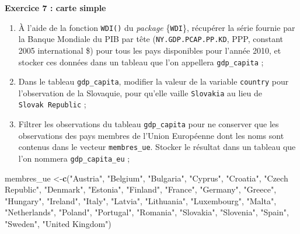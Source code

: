 \documentclass[
  11pt,
]{book}
\makeatletter
\newenvironment{Shaded}{\begin{snugshade}}{\end{snugshade}}
\newcommand{\KeywordTok}[1]{\textcolor[rgb]{0.13,0.29,0.53}{\textbf{#1}}}
\newcommand{\NormalTok}[1]{#1}
\newcommand{\StringTok}[1]{\textcolor[rgb]{0.31,0.60,0.02}{#1}}
\numberwithin{equation}{section}
\numberwithin{countremarque}{section}
\newenvironment{exframe}{%
 \def\at@end@of@exframe{}%
 \ifinner\ifhmode%
  \def\at@end@of@exframe{\end{minipage}}%
  \begin{minipage}{\columnwidth}%
 \fi\fi%
 \def\FrameCommand##1{\hskip\@totalleftmargin \hskip-\fboxsep
 \colorbox{shadecolorex}{##1}\hskip-\fboxsep
     \hskip-\linewidth \hskip-\@totalleftmargin \hskip\columnwidth}%
 \MakeFramed {\advance\hsize-\width
   \@totalleftmargin\z@ \linewidth\hsize
   \@setminipage}}%
 {\par\unskip\endMakeFramed%
 \at@end@of@exframe}
\makeatother
\begin{document}
\begin{exframe}
\textbf{Exercice 7 : carte simple}

\begin{enumerate}
\def\labelenumi{\arabic{enumi}.}
\item
  À l'aide de la fonction \texttt{WDI()} du \emph{package} \{\texttt{WDI}\}, récupérer la série fournie par la Banque Mondiale du PIB par tête (\texttt{NY.GDP.PCAP.PP.KD}, PPP, constant 2005 international \$) pour tous les pays disponibles pour l'année 2010, et stocker ces données dans un tableau que l'on appellera \texttt{gdp\_capita} ;
\item
  Dans le tableau \texttt{gdp\_capita}, modifier la valeur de la variable \texttt{country} pour l'observation de la Slovaquie, pour qu'elle vaille \texttt{Slovakia} au lieu de \texttt{Slovak\ Republic} ;
\item
  Filtrer les observations du tableau \texttt{gdp\_capita} pour ne conserver que les observations des pays membres de l'Union Européenne dont les noms sont contenus dans le vecteur \texttt{membres\_ue}. Stocker le résultat dans un tableau que l'on nommera \texttt{gdp\_capita\_eu} ;
\end{enumerate}
\end{exframe}

\begin{Shaded}
\begin{Highlighting}[]
\NormalTok{membres\_ue \textless{}{-}}\KeywordTok{c}\NormalTok{(}\StringTok{"Austria"}\NormalTok{, }\StringTok{"Belgium"}\NormalTok{, }\StringTok{"Bulgaria"}\NormalTok{, }\StringTok{"Cyprus"}\NormalTok{, }\StringTok{"Croatia"}\NormalTok{,}
              \StringTok{"Czech Republic"}\NormalTok{, }\StringTok{"Denmark"}\NormalTok{, }\StringTok{"Estonia"}\NormalTok{, }\StringTok{"Finland"}\NormalTok{, }\StringTok{"France"}\NormalTok{,}
              \StringTok{"Germany"}\NormalTok{, }\StringTok{"Greece"}\NormalTok{, }\StringTok{"Hungary"}\NormalTok{, }\StringTok{"Ireland"}\NormalTok{, }\StringTok{"Italy"}\NormalTok{, }\StringTok{"Latvia"}\NormalTok{,}
              \StringTok{"Lithuania"}\NormalTok{, }\StringTok{"Luxembourg"}\NormalTok{, }\StringTok{"Malta"}\NormalTok{, }\StringTok{"Netherlands"}\NormalTok{, }\StringTok{"Poland"}\NormalTok{,}
              \StringTok{"Portugal"}\NormalTok{, }\StringTok{"Romania"}\NormalTok{, }\StringTok{"Slovakia"}\NormalTok{, }\StringTok{"Slovenia"}\NormalTok{, }\StringTok{"Spain"}\NormalTok{,}
              \StringTok{"Sweden"}\NormalTok{, }\StringTok{"United Kingdom"}\NormalTok{)}
\end{Highlighting}
\end{Shaded}
\end{document}
